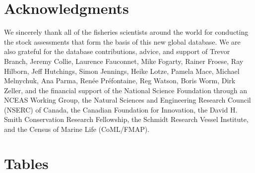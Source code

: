 \documentclass[letterpaper,12pt]{article}
\begin{document}
\section*{Acknowledgments }
We sincerely thank all of the fisheries scientists around the world
for conducting the stock assessments that form the basis of this new
global database. We are also grateful for the database contributions,
advice, and support of Trevor Branch, Jeremy Collie, Laurence
Fauconnet, Mike Fogarty, Rainer Froese, Ray Hilborn, Jeff Hutchings,
Simon Jennings, Heike Lotze, Pamela Mace, Michael Melnychuk, Ana
Parma, Ren\'{e}e Pr\'{e}fontaine, Reg Watson, Boris Worm, Dirk Zeller,
and the financial support of the National Science Foundation through
an NCEAS Working Group, the Natural Sciences and Engineering Research
Council (NSERC) of Canada, the Canadian Foundation for Innovation, the
David H. Smith Conservation Research Fellowship, the Schmidt Research
Vessel Institute, and the Census of Marine Life (CoML/FMAP).

\newpage
%
%




%
\section*{Tables}


\end{document}

